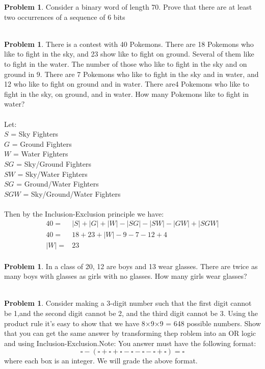 \documentclass[10pt,leqno ]{article}
\theoremstyle{definition}
\newtheorem{problem}[theorem]{Problem}
\begin{document}
\begin{problem} Consider a binary word of length 70.  Prove that there are at least two occurrences of a sequence of 6 bits
\\\\
\Large
\end{problem}
\newpage

\begin{problem} There is a contest with 40 Pokemons.  There are 18 Pokemons who like to fight in the sky, and 23 show like to fight on ground.  Several of them like to fight in the water.  The number of those who like to fight in the sky and on ground in 9.  There are 7 Pokemons who like to fight in the sky and in water, and 12 who like to fight on ground and in water.  There are4 Pokemons who like to fight in the sky, on ground, and in water.  How many Pokemons like to fight in water?
\\\\
\Large
Let:\\
$S$ = Sky Fighters\\
$G$ = Ground Fighters\\
$W$ = Water Fighters\\
$SG$ = Sky/Ground Fighters\\
$SW$ = Sky/Water Fighters\\
$SG$ = Ground/Water Fighters\\
$SGW$ = Sky/Ground/Water Fighters\\\\
Then by the Inclusion-Exclusion principle we have:
\begin{align*}
40 =& |S| + |G| + |W| - |SG| - |SW| - |GW| + |SGW|\\
40 =& 18 + 23 + |W| - 9 - 7 - 12 + 4\\
|W| =& 23\\
\end{align*}
\end{problem}
\newpage

\begin{problem}  In a class of 20, 12 are boys and 13 wear glasses.  There are twice as many boys with glasses as girls with no glasses.  How many girls wear glasses?
\\\\
\Large
\end{problem}
\newpage

\begin{problem} Consider making a 3-digit number such that the first digit cannot be 1,and the second digit cannot be 2, and the third digit cannot be 3.  Using the product rule it’s easy to show that we have 8×9×9 = 648 possible numbers.   Show  that  you  can  get  the  same  answer  by  transforming  thep roblem into an OR logic and using Inclusion-Exclusion.Note:  You answer must have the following format:
$$\square - (\square + \square + \square - \square - \square - \square + \square) = \square$$
where each box is an integer.  We will grade the above format.
\\\\
\Large
\end{problem}
\newpage
\end{document}
